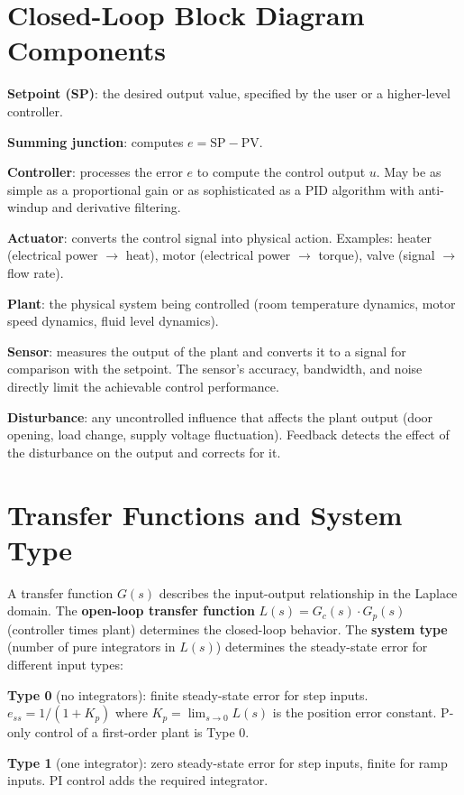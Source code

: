 \documentclass[11pt,letterpaper,twoside,openany]{book}
\begin{document}
\section{Closed-Loop Block Diagram Components}
\textbf{Setpoint (SP)}: the desired output value, specified by the user or a higher-level controller.

\textbf{Summing junction}: computes $e = \text{SP} - \text{PV}$.

\textbf{Controller}: processes the error $e$ to compute the control output $u$. May be as simple as a proportional gain or as sophisticated as a PID algorithm with anti-windup and derivative filtering.

\textbf{Actuator}: converts the control signal into physical action. Examples: heater (electrical power $\to$ heat), motor (electrical power $\to$ torque), valve (signal $\to$ flow rate).

\textbf{Plant}: the physical system being controlled (room temperature dynamics, motor speed dynamics, fluid level dynamics).

\textbf{Sensor}: measures the output of the plant and converts it to a signal for comparison with the setpoint. The sensor's accuracy, bandwidth, and noise directly limit the achievable control performance.

\textbf{Disturbance}: any uncontrolled influence that affects the plant output (door opening, load change, supply voltage fluctuation). Feedback detects the effect of the disturbance on the output and corrects for it.

\section{Transfer Functions and System Type}
A transfer function $G(s)$ describes the input-output relationship in the Laplace domain. The \textbf{open-loop transfer function} $L(s) = G_c(s) \cdot G_p(s)$ (controller times plant) determines the closed-loop behavior. The \textbf{system type} (number of pure integrators in $L(s)$) determines the steady-state error for different input types:

\textbf{Type 0} (no integrators): finite steady-state error for step inputs. $e_{ss} = 1/(1 + K_p)$ where $K_p = \lim_{s\to 0} L(s)$ is the position error constant. P-only control of a first-order plant is Type 0.

\textbf{Type 1} (one integrator): zero steady-state error for step inputs, finite for ramp inputs. PI control adds the required integrator.
\end{document}
